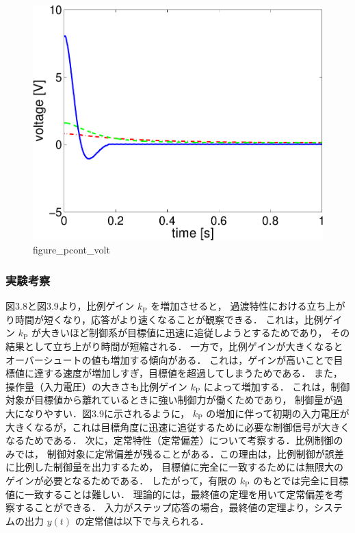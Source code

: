 \begin{figure}[h]
  \centering
  \includegraphics[scale=0.6]{sozai/figure_pcont_volt-crop.pdf}
  \caption{figure\_pcont\_volt}
\end{figure}

\subsubsection{実験考察}
図3.8と図3.9より，比例ゲイン \( k_{\mathrm{P}}\) を増加させると，
過渡特性における立ち上がり時間が短くなり，応答がより速くなることが観察できる．
これは，比例ゲイン \( k_{\mathrm{P}}\) が大きいほど制御系が目標値に迅速に追従しようとするためであり，
その結果として立ち上がり時間が短縮される．
一方で，比例ゲインが大きくなるとオーバーシュートの値も増加する傾向がある．
これは，ゲインが高いことで目標値に達する速度が増加しすぎ，目標値を超過してしまうためである．
また，操作量（入力電圧）の大きさも比例ゲイン \( k_{\mathrm{P}}\) によって増加する．
これは，制御対象が目標値から離れているときに強い制御力が働くためであり，
制御量が過大になりやすい．図3.9に示されるように， \( k_{\mathrm{P}}\) の増加に伴って初期の入力電圧が
大きくなるが，これは目標角度に迅速に追従するために必要な制御信号が大きくなるためである．
次に，定常特性（定常偏差）について考察する．比例制御のみでは，
制御対象に定常偏差が残ることがある．この理由は，比例制御が誤差に比例した制御量を出力するため，
目標値に完全に一致するためには無限大のゲインが必要となるためである．
したがって，有限の \( k_{\mathrm{P}}\)  のもとでは完全に目標値に一致することは難しい．
理論的には，最終値の定理を用いて定常偏差を考察することができる．
入力がステップ応答の場合，最終値の定理より，システムの出力 \( y(t) \) の定常値は以下で与えられる．

